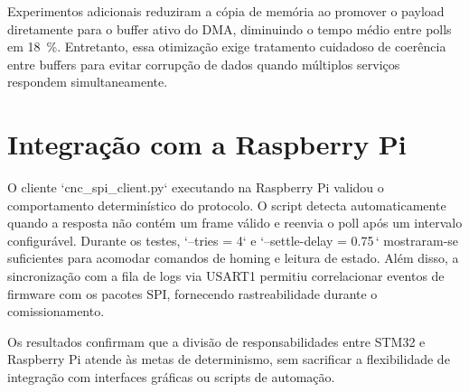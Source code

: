 Experimentos adicionais reduziram a cópia de memória ao promover o
payload diretamente para o buffer ativo do DMA, diminuindo o tempo médio
entre polls em \SI{18}{\percent}. Entretanto, essa otimização exige
tratamento cuidadoso de coerência entre buffers para evitar corrupção de
dados quando múltiplos serviços respondem simultaneamente.

\section{Integração com a Raspberry Pi}

O cliente `cnc_spi_client.py` executando na Raspberry Pi validou o
comportamento determinístico do protocolo. O script detecta automaticamente
quando a resposta não contém um frame válido e reenvia o poll após um
intervalo configurável. Durante os testes, `--tries = 4` e
`--settle-delay = 0.75\,` mostraram-se suficientes para
acomodar comandos de homing e leitura de estado. Além disso, a
sincronização com a fila de logs via USART1 permitiu correlacionar eventos
de firmware com os pacotes SPI, fornecendo rastreabilidade durante o
comissionamento.

Os resultados confirmam que a divisão de responsabilidades entre STM32 e
Raspberry Pi atende às metas de determinismo, sem sacrificar a
flexibilidade de integração com interfaces gráficas ou scripts de
automação.

